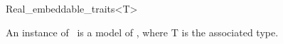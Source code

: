\begin{ccRefClass}{Real_embeddable_traits<T>}

\ccDefinition

An instance of \ccClassTemplateName\ is a model of , where {\sc T} is the associated type. 


\ccSeeAlso
{}\\

\end{ccRefClass} 